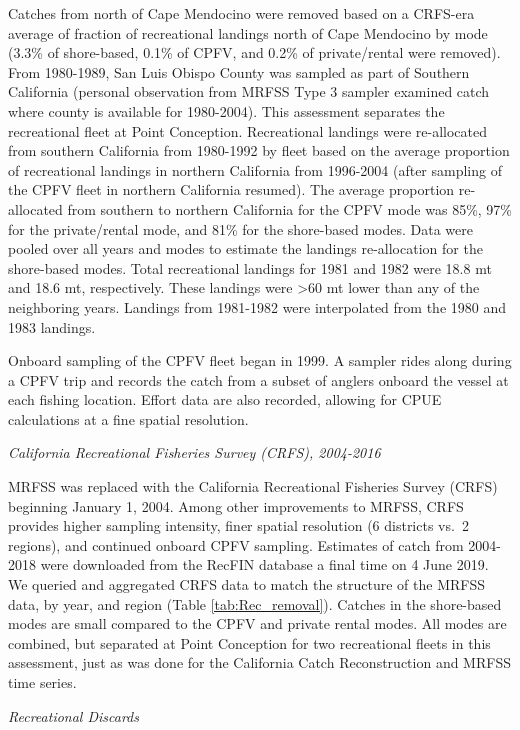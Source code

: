 \documentclass[12pt,]{article}
\begin{document}
Catches from north of Cape Mendocino were removed based on a CRFS-era
average of fraction of recreational landings north of Cape Mendocino by
mode (3.3\% of shore-based, 0.1\% of CPFV, and 0.2\% of private/rental
were removed). From 1980-1989, San Luis Obispo County was sampled as
part of Southern California (personal observation from MRFSS Type 3
sampler examined catch where county is available for 1980-2004). This
assessment separates the recreational fleet at Point Conception.
Recreational landings were re-allocated from southern California from
1980-1992 by fleet based on the average proportion of recreational
landings in northern California from 1996-2004 (after sampling of the
CPFV fleet in northern California resumed). The average proportion
re-allocated from southern to northern California for the CPFV mode was
85\%, 97\% for the private/rental mode, and 81\% for the shore-based
modes. Data were pooled over all years and modes to estimate the
landings re-allocation for the shore-based modes. Total recreational
landings for 1981 and 1982 were 18.8 mt and 18.6 mt, respectively. These
landings were \textgreater{}60 mt lower than any of the neighboring
years. Landings from 1981-1982 were interpolated from the 1980 and 1983
landings.

Onboard sampling of the CPFV fleet began in 1999. A sampler rides along
during a CPFV trip and records the catch from a subset of anglers
onboard the vessel at each fishing location. Effort data are also
recorded, allowing for CPUE calculations at a fine spatial resolution.

\emph{California Recreational Fisheries Survey (CRFS), 2004-2016}

MRFSS was replaced with the California Recreational Fisheries Survey
(CRFS) beginning January 1, 2004. Among other improvements to MRFSS,
CRFS provides higher sampling intensity, finer spatial resolution (6
districts vs.~2 regions), and continued onboard CPFV sampling. Estimates
of catch from 2004-2018 were downloaded from the RecFIN database a final
time on 4 June 2019. We queried and aggregated CRFS data to match the
structure of the MRFSS data, by year, and region (Table
\ref{tab:Rec_removal}). Catches in the shore-based modes are small
compared to the CPFV and private rental modes. All modes are combined,
but separated at Point Conception for two recreational fleets in this
assessment, just as was done for the California Catch Reconstruction and
MRFSS time series.

\emph{Recreational Discards}
\end{document}
